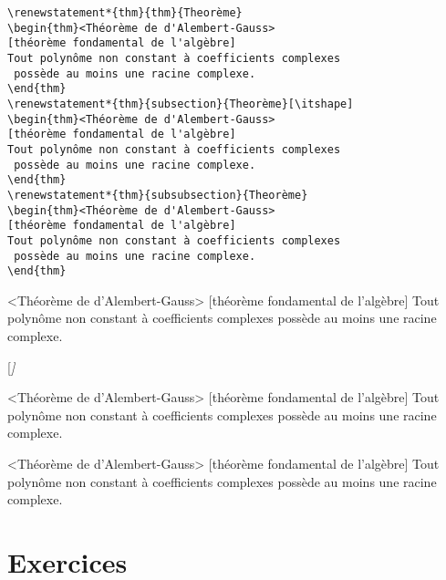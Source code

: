 \documentclass[french,ColorTheme=USAF,FontSize=10pt]{tango}
\begin{document}
\begin{example}[Exemples]
\begin{enumerate}[resume]
\begin{tcolorbox}
\begin{verbatim}
\renewstatement*{thm}{thm}{Theorème}
\begin{thm}<Théorème de d'Alembert-Gauss>
[théorème fondamental de l'algèbre]
Tout polynôme non constant à coefficients complexes
 possède au moins une racine complexe.
\end{thm}
\renewstatement*{thm}{subsection}{Theorème}[\itshape]
\begin{thm}<Théorème de d'Alembert-Gauss>
[théorème fondamental de l'algèbre]
Tout polynôme non constant à coefficients complexes
 possède au moins une racine complexe.
\end{thm}
\renewstatement*{thm}{subsubsection}{Theorème}
\begin{thm}<Théorème de d'Alembert-Gauss>
[théorème fondamental de l'algèbre]
Tout polynôme non constant à coefficients complexes
 possède au moins une racine complexe.
\end{thm}
\end{verbatim}
\end{tcolorbox}
\end{enumerate}
\end{example}
\begin{thm}<Théorème de d'Alembert-Gauss>
[théorème fondamental de l'algèbre]
Tout polynôme non constant à coefficients complexes
 possède au moins une racine complexe.
\end{thm}
[\itshape]
\begin{thm}<Théorème de d'Alembert-Gauss>
[théorème fondamental de l'algèbre]
Tout polynôme non constant à coefficients complexes
 possède au moins une racine complexe.
\end{thm}
\begin{thm}<Théorème de d'Alembert-Gauss>
[théorème fondamental de l'algèbre]
Tout polynôme non constant à coefficients complexes
 possède au moins une racine complexe.
\end{thm}



\section{Exercices}
\end{document}
